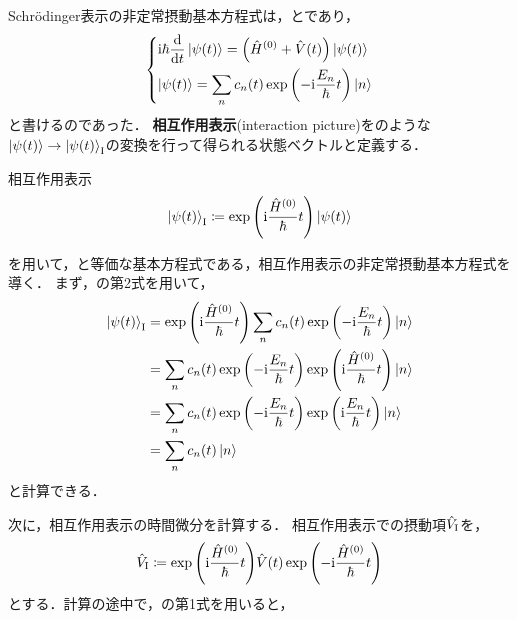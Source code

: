 \documentclass{report}
\begin{document}
  Schr\"odinger表示の非定常摂動基本方程式は，とであり，
  \begin{align}
    \begin{dcases}
      \mathrm{i}\hbar\dv{t}\ket{\psi(t)} = \qty(\hat{H}^{(0)} + \hat{V}(t))\ket{\psi(t)} \label{time-dependent-schrodinger-eq-re} \\
      \ket{\psi(t)} = \sum_{n}c_n(t)\exp\qty(-\mathrm{i}\frac{E_n}{\hbar}t)\ket{n}
    \end{dcases}
  \end{align}
  と書けるのであった．
  \textbf{相互作用表示}(interaction picture)をのような$\ket{\psi(t)} \to \ket{\psi(t)}_{\mathrm{I}}$の変換を行って得られる状態ベクトルと定義する．
  \begin{itembox}[l]{相互作用表示}
    \begin{align}
      \ket{\psi(t)}_{\mathrm{I}} \coloneqq \exp\qty(\mathrm{i}\frac{\hat{H}^{(0)}}{\hbar}t)\ket{\psi(t)}\label{interaction-picture}
    \end{align}
  \end{itembox}
  を用いて，と等価な基本方程式である，相互作用表示の非定常摂動基本方程式を導く．
  まず，の第2式を用いて，
  \begin{align}
    \ket{\psi(t)}_{\mathrm{I}} &= \exp\qty(\mathrm{i}\frac{\hat{H}^{(0)}}{\hbar}t)\sum_{n}c_n(t)\exp\qty(-\mathrm{i}\frac{E_n}{\hbar}t)\ket{n}\\
    &= \sum_{n}c_n(t)\exp\qty(-\mathrm{i}\frac{E_n}{\hbar}t)\exp\qty(\mathrm{i}\frac{\hat{H}^{(0)}}{\hbar}t)\ket{n} \\ 
    &= \sum_{n}c_n(t)\exp\qty(-\mathrm{i}\frac{E_n}{\hbar}t)\exp\qty(\mathrm{i}\frac{E_n}{\hbar}t)\ket{n} \\ 
    &= \sum_{n}c_n(t)\ket{n} \label{psi-t-cnt}
  \end{align}
  と計算できる．
  \par
  次に，相互作用表示の時間微分を計算する．
  相互作用表示での摂動項$\hat{V}_{\mathrm{I}}$を，
  \begin{align}
    \hat{V}_{\mathrm{I}} \coloneqq \exp\qty(\mathrm{i}\frac{\hat{H}^{(0)}}{\hbar}t)\hat{V}(t)\exp\qty(-\mathrm{i}\frac{\hat{H}^{(0)}}{\hbar}t) \label{time-dependent-schrodinger-eq-re-2nd-eq-interaction-picture}
  \end{align}
  とする．計算の途中で，の第1式を用いると，
\end{document}
